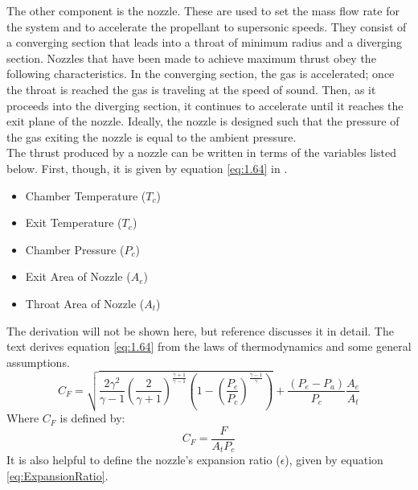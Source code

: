 The other component is the nozzle. These are used to set the mass flow rate for the system and to accelerate the propellant to supersonic speeds. They consist of a converging section that leads into a throat of minimum radius and a diverging section. Nozzles that have been made to achieve maximum thrust obey the following characteristics. In the converging section, the gas is accelerated; once the throat is reached the gas is traveling at the speed of sound. Then, as it proceeds into the diverging section, it continues to accelerate until it reaches the exit plane of the nozzle. Ideally, the nozzle is designed such that the pressure of the gas exiting the nozzle is equal to the ambient pressure. \\
The thrust produced by a nozzle can be written in terms of the variables listed below. First, though, it is given by equation \ref{eq:1.64} in \cite{RocketPropulsion}.
\begin{itemize}
\item Chamber Temperature ($T_c$)
\item Exit Temperature ($T_e$)
\item Chamber Pressure ($P_c$)
\item Exit Area of Nozzle ($A_e$)
\item Throat Area of Nozzle ($A_t$)
\end{itemize}%
%
%
%
%
%
The derivation will not be shown here, but reference \cite{RocketPropulsion} discusses it in detail. The text derives equation \ref{eq:1.64} from the laws of thermodynamics and some general assumptions.
\begin{equation}\label{eq:1.64}
C_F= \sqrt{\frac{2\gamma^2}{\gamma-1}\left(\frac{2}{\gamma+1}\right)^{\frac{\gamma+1}{\gamma-1}}\left(1-\left(\frac{P_e}{P_c}\right)^{\frac{\gamma-1}{\gamma}}\right)}+\frac{\left(P_e-P_a\right)}{P_c}\frac{A_e}{A_t}
\end{equation}%
%
%
%
%
Where $C_F$ is defined by:
\begin{equation}\label{eq:ThrustCoefficient}
C_F=\frac{F}{A_tP_c}
\end{equation}
It is also helpful to define the nozzle's expansion ratio ($\epsilon$), given by equation \ref{eq:ExpansionRatio}.
